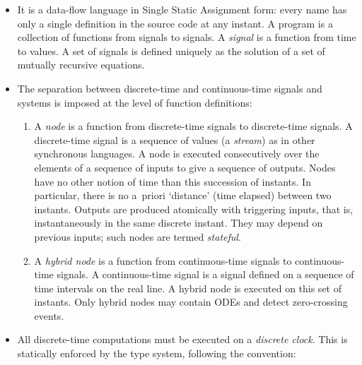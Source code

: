 \documentclass[11pt,titlepage,twoside]{report}
\newenvironment{flatitemize}
  {\begin{itemize}[leftmargin=*]}
  {\end{itemize}}
\newcommand{\zelus}{{\sf Z\'elus}}
\begin{document}
\begin{flatitemize}
\item
It is a data-flow language in Single Static Assignment form: every name has 
only a single definition in the source code at any instant. A program is a 
collection of functions from signals to signals. A \emph{signal} is a 
function from time
to values. A set of signals is defined uniquely as
the solution of a set of mutually recursive equations.
\item
The separation between discrete-time and continuous-time signals and
systems is imposed at the level of function definitions:
  \begin{enumerate}
  \item
    A \emph{node} is a function from discrete-time signals to
    discrete-time signals. A discrete-time signal is a sequence of values (a 
    \emph{stream}) as in other synchronous languages.
    A node is executed consecutively over the elements of a sequence of 
    inputs to give a sequence of outputs.
    Nodes have no other notion of time than this succession of instants.
    In particular, there is no a~priori `distance' (time elapsed) between 
    two instants.
    Outputs are produced atomically with triggering inputs, that is, 
    instantaneously in the same discrete instant.
    They may depend on previous inputs; such nodes are termed 
    \emph{stateful}.
  \item
    A \emph{hybrid node} is a function from continuous-time signals to
    continuous-time signals. A continuous-time signal is a signal
    defined on a sequence of time intervals on the real
    line.
    A hybrid node is executed on this set of instants. Only hybrid nodes
    may contain ODEs and detect zero-crossing events.
  \end{enumerate}
\item
All
discrete-time computations must be executed on a \emph{discrete clock}.
This is statically enforced by the type system, following the convention:


\end{flatitemize}
\end{document}
